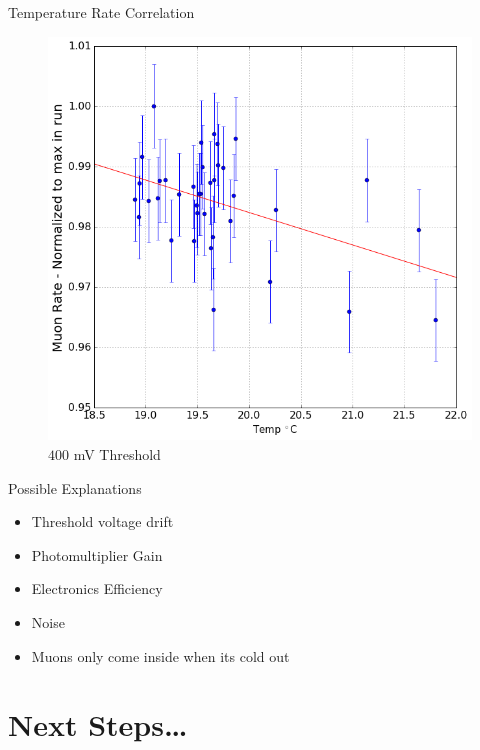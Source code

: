 \documentclass{beamer}
\begin{document}
\begin{frame}{Temperature Rate Correlation}
\begin{figure}
\begin{multicols}{2}
\includegraphics[scale=.22]{../Figures/highCorrelation.png}\\
$400$ mV Threshold
\end{multicols}
\vspace {0pt}
{\caption*{}}
\end{figure}

\end{frame}


\begin{frame}{Possible Explanations}
	\begin{itemize}
	\item Threshold voltage drift
	\item Photomultiplier Gain
	\item Electronics Efficiency
	\item Noise
	\item Muons only come inside when its cold out
	\end{itemize}
\end{frame}


\section{Next Steps\dots{}}
\end{document}
